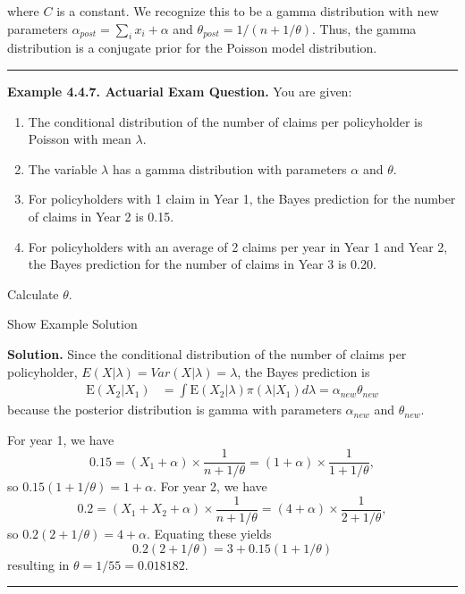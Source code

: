 \documentclass[]{book}
\providecommand{\tightlist}{%
  \setlength{\itemsep}{0pt}\setlength{\parskip}{0pt}}
\theoremstyle{definition}
\theoremstyle{definition}
\theoremstyle{definition}
\theoremstyle{remark}
\begin{document}
where \(C\) is a constant. We recognize this to be a gamma distribution
with new parameters \(\alpha_{post} = \sum_i x_i + \alpha\) and
\(\theta_{post} = 1/(n + 1/\theta)\). Thus, the gamma distribution is a
conjugate prior for the Poisson model distribution.

\begin{center}\rule{0.5\linewidth}{\linethickness}\end{center}

\textbf{Example 4.4.7. Actuarial Exam Question.} You are given:

\begin{enumerate}
\def\labelenumi{(\roman{enumi})}
\tightlist
\item
  The conditional distribution of the number of claims per policyholder
  is Poisson with mean \(\lambda\).
\item
  The variable \(\lambda\) has a gamma distribution with parameters
  \(\alpha\) and \(\theta\).
\item
  For policyholders with 1 claim in Year 1, the Bayes prediction for the
  number of claims in Year 2 is 0.15.
\item
  For policyholders with an average of 2 claims per year in Year 1 and
  Year 2, the Bayes prediction for the number of claims in Year 3 is
  0.20.
\end{enumerate}

Calculate \(\theta\).

Show Example Solution

\hypertarget{toggleExampleSelect.4.7}{}
\textbf{Solution.} Since the conditional distribution of the number of
claims per policyholder, \(E(X|\lambda)=Var(X|\lambda)=\lambda\), the
Bayes prediction is \[\begin{aligned}
\mathrm{E}(X_2|X_1)
&= \int \mathrm{E}(X_2|\lambda) \pi(\lambda|X_1) d\lambda = \alpha_{new} \theta_{new}
\end{aligned}\] because the posterior distribution is gamma with
parameters \(\alpha_{new}\) and \(\theta_{new}\).

For year 1, we have \[
0.15 = (X_1 + \alpha) \times \frac{1}{n+1/\theta} = (1 + \alpha) \times \frac{1}{1+1/\theta},
\] so \(0.15(1+1/\theta)= 1 + \alpha.\) For year 2, we have \[
0.2 = (X_1+X_2 + \alpha) \times \frac{1}{n+1/\theta} = (4 + \alpha) \times \frac{1}{2+1/\theta},
\] so \(0.2(2+1/\theta)= 4 + \alpha.\) Equating these yields \[
0.2(2+1/\theta)=3 + 0.15(1+1/\theta)
\] resulting in \(\theta = 1/55 = 0.018182\).

\begin{center}\rule{0.5\linewidth}{\linethickness}\end{center}
\end{document}

